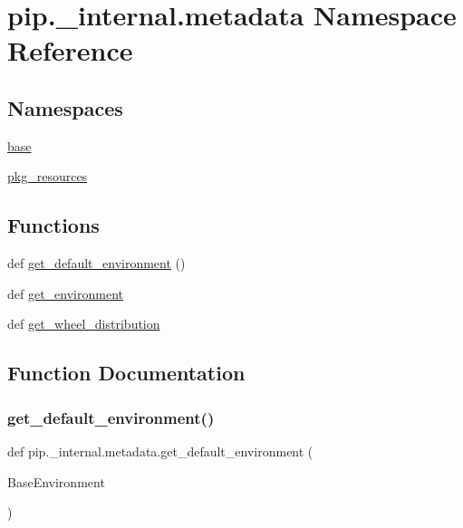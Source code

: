 \hypertarget{namespacepip_1_1__internal_1_1metadata}{}\section{pip.\+\_\+internal.\+metadata Namespace Reference}
\label{namespacepip_1_1__internal_1_1metadata}
\subsection*{Namespaces}
\begin{DoxyCompactItemize}
\item 
 \hyperlink{namespacepip_1_1__internal_1_1metadata_1_1base}{base}
\item 
 \hyperlink{namespacepip_1_1__internal_1_1metadata_1_1pkg__resources}{pkg\+\_\+resources}
\end{DoxyCompactItemize}
\subsection*{Functions}
\begin{DoxyCompactItemize}
\item 
def \hyperlink{namespacepip_1_1__internal_1_1metadata_a557d3ea9f61bbb867ce2a094fd21527e}{get\+\_\+default\+\_\+environment} ()
\item 
def \hyperlink{namespacepip_1_1__internal_1_1metadata_a71294b12a0a33814e0a35ef08efd607f}{get\+\_\+environment}
\item 
def \hyperlink{namespacepip_1_1__internal_1_1metadata_a2239286f23e90105939d56514e0d2ebd}{get\+\_\+wheel\+\_\+distribution}
\end{DoxyCompactItemize}


\subsection{Function Documentation}
\mbox{\label{namespacepip_1_1__internal_1_1metadata_a557d3ea9f61bbb867ce2a094fd21527e}} 
\subsubsection{\texorpdfstring{get\+\_\+default\+\_\+environment()}{get\_default\_environment()}}
{\footnotesize\ttfamily def pip.\+\_\+internal.\+metadata.\+get\+\_\+default\+\_\+environment (\begin{DoxyParamCaption}\item[{}]{Base\+Environment }\end{DoxyParamCaption})}

